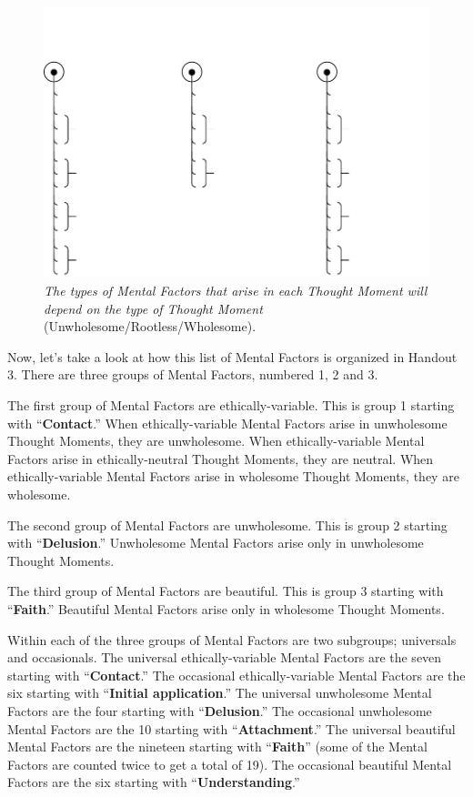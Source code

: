 \begin{figure}[h]
\centering
\includegraphics[width=1.0\linewidth]{./Diagrams/Ment_Fact}
\caption{{\small \textit{The types of Mental Factors that arise in each Thought Moment will depend on the type of Thought Moment }(Unwholesome/Rootless/Wholesome).}}
\label{fig:MentalFactors}
\end{figure}

Now, let’s take a look at how this list of Mental Factors is organized in Handout 3. There are three groups of Mental Factors, numbered 1, 2 and 3.

The first group of Mental Factors are ethically-variable. This is group 1 starting with “\textbf{Contact}.” When ethically-variable Mental Factors arise in unwholesome Thought Moments, they are unwholesome. When ethically-variable Mental Factors arise in ethically-neutral Thought Moments, they are neutral. When ethically-variable Mental Factors arise in wholesome Thought Moments, they are wholesome.

The second group of Mental Factors are unwholesome. This is group 2 starting with “\textbf{Delusion}.” Unwholesome Mental Factors arise only in unwholesome Thought Moments.

The third group of Mental Factors are beautiful. This is group 3 starting with “\textbf{Faith}.” Beautiful Mental Factors arise only in wholesome Thought Moments.

Within each of the three groups of Mental Factors are two subgroups; universals and occasionals. The universal ethically-variable Mental Factors are the seven starting with “\textbf{Contact}.” The occasional ethically-variable Mental Factors are the six starting with “\textbf{Initial application}.” The universal unwholesome Mental Factors are the four starting with “\textbf{Delusion}.” The occasional unwholesome Mental Factors are the 10 starting with “\textbf{Attachment}.” The universal beautiful Mental Factors are the nineteen starting with “\textbf{Faith}” (some of the Mental Factors are counted twice to get a total of 19). The occasional beautiful Mental Factors are the six starting with “\textbf{Understanding}.”

